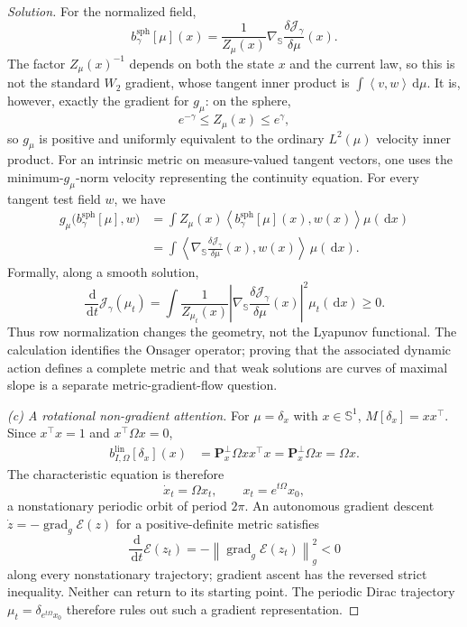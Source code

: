 \documentclass[11pt]{amsart}
\numberwithin{equation}{section}
\theoremstyle{plain}
\newcommand{\dd}{\,\mathrm{d}}
\newcommand{\norm}[1]{\left\lVert#1\right\rVert}
\newcommand{\ip}[2]{\left\langle#1,#2\right\rangle}
\begin{document}
\begin{proof}[Solution]
For the normalized field,
\[
 b_\gamma^{\mathrm{sph}}[\mu](x)
 =\frac1{Z_\mu(x)}\nabla_{\mathbb S}
 \frac{\delta\mathcal J_\gamma}{\delta\mu}(x).
\]
The factor $Z_\mu(x)^{-1}$ depends on both the state $x$ and the current law,
so this is not the standard $W_2$ gradient, whose tangent inner product is
$\int\ip{v}{w}\dd\mu$.  It is, however, exactly the gradient for $g_\mu$:
on the sphere,
\[
 e^{-\gamma}\leq Z_\mu(x)\leq e^\gamma,
\]
so $g_\mu$ is positive and uniformly equivalent to the ordinary
$L^2(\mu)$ velocity inner product.  For an intrinsic metric on measure-valued
tangent vectors, one uses the minimum-$g_\mu$-norm velocity representing the
continuity equation.  For every tangent test field $w$, we have
\begin{align*}
 g_\mu\bigl(b_\gamma^{\mathrm{sph}}[\mu],w\bigr)
 &=\int Z_\mu(x)\ip{b_\gamma^{\mathrm{sph}}[\mu](x)}{w(x)}
       \mu(\dd x)\\
 &=\int\ip{\nabla_{\mathbb S}
       \frac{\delta\mathcal J_\gamma}{\delta\mu}(x)}{w(x)}\,
       \mu(\dd x).
\end{align*}
Formally, along a smooth solution,
\[
 \frac{\dd}{\dd t}\mathcal J_\gamma(\mu_t)
 =\int\frac1{Z_{\mu_t}(x)}
 \left|\nabla_{\mathbb S}
 \frac{\delta\mathcal J_\gamma}{\delta\mu}(x)\right|^2
 \mu_t(\dd x)\geq0.
\]
Thus row normalization changes the geometry, not the Lyapunov functional.
The calculation identifies the Onsager operator; proving that the associated
dynamic action defines a complete metric and that weak solutions are curves
of maximal slope is a separate metric-gradient-flow question.

\emph{(c) A rotational non-gradient attention.}
For $\mu=\delta_x$ with $x\in\mathbb S^1$,
$M[\delta_x]=xx^\top$.  Since $x^\top x=1$ and
$x^\top\Omega x=0$,
\begin{align*}
 b_{I,\Omega}^{\mathrm{lin}}[\delta_x](x)
 &=\mathbf P_x^\perp\Omega xx^\top x
 =\mathbf P_x^\perp\Omega x
 =\Omega x.
\end{align*}
The characteristic equation is therefore
\[
 \dot x_t=\Omega x_t,
 \qquad x_t=e^{t\Omega}x_0,
\]
a nonstationary periodic orbit of period $2\pi$.  An autonomous gradient
descent $\dot z=-\operatorname{grad}_g\mathcal E(z)$ for a positive-definite
metric satisfies
\[
 \frac{\dd}{\dd t}\mathcal E(z_t)
 =-\norm{\operatorname{grad}_g\mathcal E(z_t)}_g^2<0
\]
along every nonstationary trajectory; gradient ascent has the reversed strict
inequality.  Neither can return to its starting point.  The periodic Dirac
trajectory $\mu_t=\delta_{e^{t\Omega}x_0}$ therefore rules out such a gradient
representation.


\end{proof}
\end{document}
